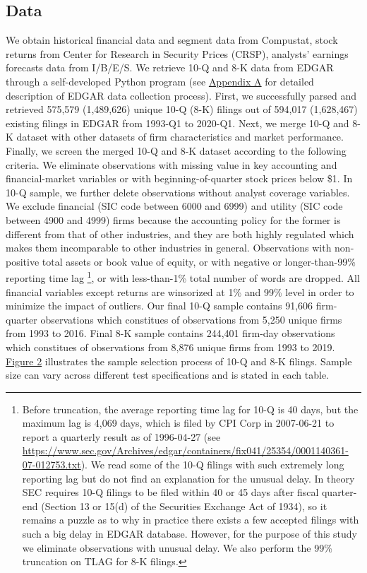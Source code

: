 \documentclass[a4paper]{article}
\begin{document}
\begin{spacing}{2}
\subsection{Data}
We obtain historical financial data and segment data from Compustat, stock returns from Center for Research in Security Prices (CRSP), analysts’ earnings forecasts data from I/B/E/S. We retrieve 10-Q and 8-K data from EDGAR through a self-developed Python program (see \hyperref[appa]{Appendix A} for detailed description of EDGAR data collection process). First, we successfully parsed and retrieved 575,579 (1,489,626) unique 10-Q (8-K) filings out of 594,017 (1,628,467) existing filings in EDGAR from 1993-Q1 to 2020-Q1. Next, we merge 10-Q and 8-K dataset with other datasets of firm characteristics and market performance. Finally, we screen the merged 10-Q and 8-K dataset according to the following criteria. We eliminate observations with missing value in key accounting and financial-market variables or with beginning-of-quarter stock prices below \$1. In 10-Q sample, we further delete observations without analyst coverage variables. We exclude financial (SIC code between 6000 and 6999) and utility (SIC code between 4900 and 4999) firms because the accounting policy for the former is different from that of other industries, and they are both highly regulated which makes them incomparable to other industries in general. Observations with non-positive total assets or book value of equity, or with negative or longer-than-99\% reporting time lag \footnote{Before truncation, the average reporting time lag for 10-Q is 40 days, but the maximum lag is 4,069 days, which is filed by CPI Corp in 2007-06-21 to report a quarterly result as of 1996-04-27 (see \url{https://www.sec.gov/Archives/edgar/containers/fix041/25354/0001140361-07-012753.txt}). We read some of the 10-Q filings with such extremely long reporting lag but do not find an explanation for the unusual delay. In theory SEC requires 10-Q filings to be filed within 40 or 45 days after fiscal quarter-end (Section 13 or 15(d) of the Securities Exchange Act of 1934), so it remains a puzzle as to why in practice there exists a few accepted filings with such a big delay in EDGAR database. However, for the purpose of this study we eliminate observations with unusual delay. We also perform the 99\% truncation on TLAG for 8-K filings.}, or with less-than-1\% total number of words are dropped. All financial variables except returns are winsorized at 1\% and 99\% level in order to minimize the impact of outliers. Our final 10-Q sample contains 91,606 firm-quarter observations which constitues of observations from 5,250 unique firms from 1993 to 2016. Final 8-K sample contains 244,401 firm-day observations which constitues of observations from 8,876 unique firms from 1993 to 2019. \hyperref[fig2]{Figure 2} illustrates the sample selection process of 10-Q and 8-K filings. Sample size can vary across different test specifications and is stated in each table. 


\end{spacing}
\end{document}
